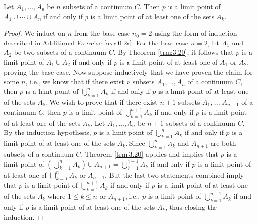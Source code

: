 \documentclass[../main.tex]{subfiles}
\begin{document}
\begin{corollary}\label{cly:3.21}
    Let $A_1,\dots,A_n$ be $n$ subsets of a continuum $C$. Then $p$ is a limit point of $A_1\cup\cdots\cup A_n$ if and only if $p$ is a limit point of at least one of the sets $A_k$.
    \begin{proof}
        We induct on $n$ from the base case $n_0=2$ using the form of induction described in Additional Exercise \ref{axr:0.2a}. For the base case $n=2$, let $A_1$ and $A_2$ be two subsets of a continuum $C$. By Theorem \ref{trm:3.20}, it follows that $p$ is a limit point of $A_1\cup A_2$ if and only if $p$ is a limit point of at least one of $A_1$ or $A_2$, proving the base case. Now suppose inductively that we have proven the claim for some $n$, i.e., we know that if there exist $n$ subsets $A_1,\dots,A_n$ of a continuum $C$, then $p$ is a limit point of $\bigcup_{k=1}^nA_k$ if and only if $p$ is a limit point of at least one of the sets $A_k$. We wish to prove that if there exist $n+1$ subsets $A_1,\dots,A_{n+1}$ of a continuum $C$, then $p$ is a limit point of $\bigcup_{k=1}^{n+1}A_k$ if and only if $p$ is a limit point of at least one of the sets $A_k$. Let $A_1,\dots,A_n$ be $n+1$ subsets of a continuum $C$. By the induction hypothesis, $p$ is a limit point of $\bigcup_{k=1}^nA_k$ if and only if $p$ is a limit point of at least one of the sets $A_k$. Since $\bigcup_{k=1}^nA_k$ and $A_{n+1}$ are both subsets of a continuum $C$, Theorem \ref{trm:3.20} applies and implies that $p$ is a limit point of $\left( \bigcup_{k=1}^nA_k \right)\cup A_{n+1}=\bigcup_{k=1}^{n+1}A_k$ if and only if $p$ is a limit point of at least one of $\bigcup_{k=1}^nA_k$ or $A_{n+1}$. But the last two statements combined imply that $p$ is a limit point of $\bigcup_{k=1}^{n+1}A_k$ if and only if $p$ is a limit point of at least one of the sets $A_k$ where $1\leq k\leq n$ or $A_{n+1}$, i.e., $p$ is a limit point of $\bigcup_{k=1}^{n+1}A_k$ if and only if $p$ is a limit point of at least one of the sets $A_k$, thus closing the induction.
    \end{proof}
\end{corollary}
\end{document}
